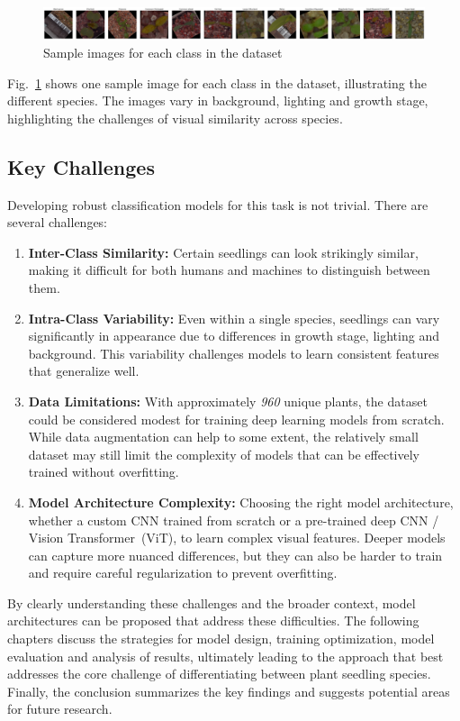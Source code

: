 \begin{figure}[htbp]
    \centerline{\includegraphics[width=0.9\linewidth]{../../resources/sample_images.png}}
    \caption{Sample images for each class in the dataset}
    \label{fig:sample-images}
\end{figure}

Fig.~\ref{fig:sample-images} shows one sample image for each class in the dataset, illustrating the different species. The images vary in background, lighting and growth stage, highlighting the challenges of visual similarity across species.

\subsection{Key Challenges}
Developing robust classification models for this task is not trivial. There are several challenges:

\begin{enumerate}
    \item \textbf{Inter-Class Similarity:} Certain seedlings can look strikingly similar, making it difficult for both humans and machines to distinguish between them.
    \item \textbf{Intra-Class Variability:} Even within a single species, seedlings can vary significantly in appearance due to differences in growth stage, lighting and background. This variability challenges models to learn consistent features that generalize well.
    \item \textbf{Data Limitations:} With approximately \textit{960} unique plants, the dataset could be considered modest for training deep learning models from scratch. While data augmentation can help to some extent, the relatively small dataset may still limit the complexity of models that can be effectively trained without overfitting.
    \item \textbf{Model Architecture Complexity:} Choosing the right model architecture, whether a custom CNN trained from scratch or a pre-trained deep CNN / Vision Transformer~(ViT), to learn complex visual features. Deeper models can capture more nuanced differences, but they can also be harder to train and require careful regularization to prevent overfitting.
\end{enumerate}

By clearly understanding these challenges and the broader context, model architectures can be proposed that address these difficulties. The following chapters discuss the strategies for model design, training optimization, model evaluation and analysis of results, ultimately leading to the approach that best addresses the core challenge of differentiating between plant seedling species. Finally, the conclusion summarizes the key findings and suggests potential areas for future research.
